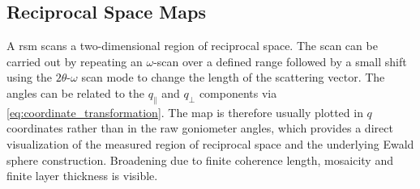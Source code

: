 \subsection{Reciprocal Space Maps}

A \ac{rsm} scans a two-dimensional region of reciprocal space. The scan can be carried
out by repeating an $\omega$-scan over a defined range followed by a small shift using
the $2\theta\text{-}\omega$ scan mode to change the length of the scattering vector.
The angles can be related to the $q_{\parallel}$ and $q_{\perp}$ components via
\cref{eq:coordinate_transformation}. The map is therefore usually plotted in $q$ coordinates
rather than in the raw goniometer angles, which provides a direct visualization
of the measured region of reciprocal space and the underlying Ewald sphere
construction. Broadening due to finite coherence length, mosaicity and finite
layer thickness is visible.
